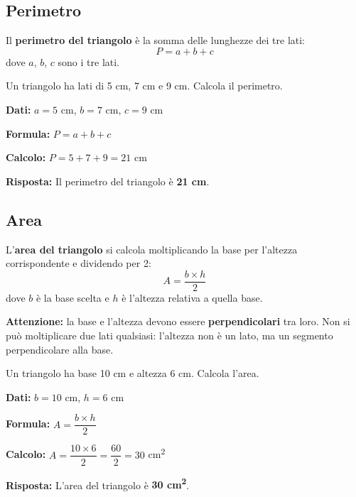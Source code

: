 \subsection{Perimetro}

\begin{regola}
    Il \textbf{perimetro del triangolo} è la somma delle lunghezze dei tre lati:
    \[
        P = a + b + c
    \]
    dove $a$, $b$, $c$ sono i tre lati.
\end{regola}

\begin{esempio}
    Un triangolo ha lati di 5 cm, 7 cm e 9 cm. Calcola il perimetro.

    \medskip
    \textbf{Dati:} $a = 5$ cm, $b = 7$ cm, $c = 9$ cm

    \textbf{Formula:} $P = a + b + c$

    \textbf{Calcolo:} $P = 5 + 7 + 9 = 21$ cm

    \textbf{Risposta:} Il perimetro del triangolo è \textbf{21 cm}.
\end{esempio}

\subsection{Area}

\begin{regola}
    L'\textbf{area del triangolo} si calcola moltiplicando la base per l'altezza corrispondente e dividendo per 2:
    \[
        A = \frac{b \times h}{2}
    \]
    dove $b$ è la base scelta e $h$ è l'altezza relativa a quella base.
\end{regola}

\begin{attenzione}
    \textbf{Attenzione:} la base e l'altezza devono essere \textbf{perpendicolari} tra loro. Non si può moltiplicare due lati qualsiasi: l'altezza non è un lato, ma un segmento perpendicolare alla base.
\end{attenzione}

\begin{esempio}
    Un triangolo ha base 10 cm e altezza 6 cm. Calcola l'area.

    \medskip
    \textbf{Dati:} $b = 10$ cm, $h = 6$ cm

    \textbf{Formula:} $A = \dfrac{b \times h}{2}$

    \textbf{Calcolo:} $A = \dfrac{10 \times 6}{2} = \dfrac{60}{2} = 30$ cm\textsuperscript{2}

    \textbf{Risposta:} L'area del triangolo è \textbf{30 cm\textsuperscript{2}}.
\end{esempio}

